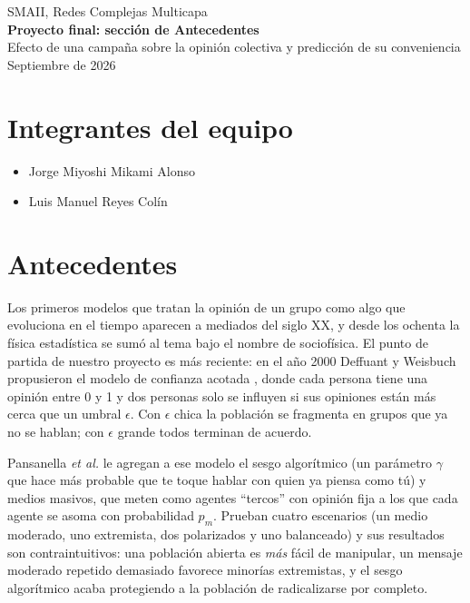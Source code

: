 \documentclass[11pt]{article}
\begin{document}
\begin{center}
	{\small SMAII, Redes Complejas Multicapa}\\[6pt]
	{\Large\bfseries Proyecto final: sección de Antecedentes}\\[3pt]
	{\normalsize Efecto de una campaña sobre la opinión colectiva y predicción de su conveniencia}\\[4pt]
	{\small Septiembre de 2026}
\end{center}

\section*{Integrantes del equipo}
\begin{itemize}
	\item Jorge Miyoshi Mikami Alonso
	\item Luis Manuel Reyes Colín
\end{itemize}

\section*{Antecedentes}

Los primeros modelos que tratan la opinión de un grupo como algo que evoluciona en el tiempo
aparecen a mediados del siglo XX, y desde los ochenta la física estadística se sumó al tema bajo
el nombre de sociofísica. El punto de partida de nuestro proyecto es más reciente: en el año 2000
Deffuant y Weisbuch propusieron el modelo de confianza acotada \cite{Deffuant2000}, donde cada
persona tiene una opinión entre 0 y 1 y dos personas solo se influyen si sus opiniones están más
cerca que un umbral $\epsilon$. Con $\epsilon$ chica la población se fragmenta en grupos que ya no
se hablan; con $\epsilon$ grande todos terminan de acuerdo.

Pansanella \emph{et al.} \cite{Pansanella2023} le agregan a ese modelo el sesgo algorítmico (un
parámetro $\gamma$ que hace más probable que te toque hablar con quien ya piensa como tú) y medios
masivos, que meten como agentes ``tercos'' con opinión fija a los que cada agente se asoma con
probabilidad $p_m$. Prueban cuatro escenarios (un medio moderado, uno extremista, dos polarizados
y uno balanceado) y sus resultados son contraintuitivos: una población abierta es \emph{más} fácil
de manipular, un mensaje moderado repetido demasiado favorece minorías extremistas, y el sesgo
algorítmico acaba protegiendo a la población de radicalizarse por completo.
\end{document}
